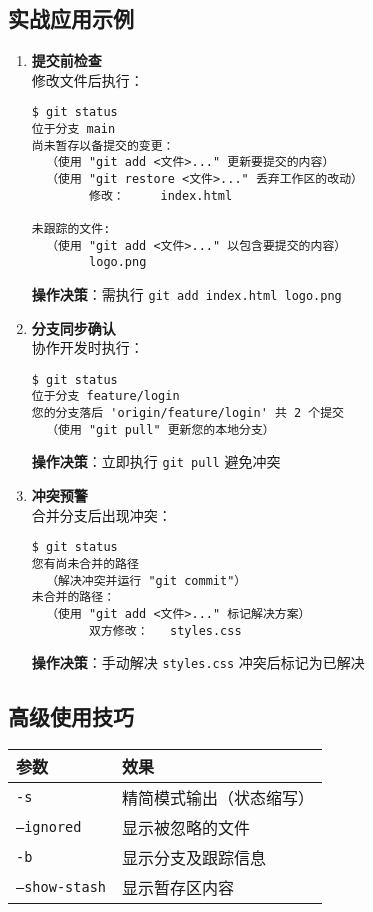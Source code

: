 \subsection{实战应用示例}
\begin{enumerate}[leftmargin=*, nosep]
    \item \textbf{提交前检查} \\
    修改文件后执行：
    \begin{verbatim}
$ git status
位于分支 main
尚未暂存以备提交的变更：
  （使用 "git add <文件>..." 更新要提交的内容）
  （使用 "git restore <文件>..." 丢弃工作区的改动）
        修改：     index.html

未跟踪的文件:
  （使用 "git add <文件>..." 以包含要提交的内容）
        logo.png
    \end{verbatim}
    \textbf{操作决策}：需执行 \texttt{git add index.html logo.png}
    
    \item \textbf{分支同步确认} \\
    协作开发时执行：
    
\begin{verbatim}
$ git status
位于分支 feature/login
您的分支落后 'origin/feature/login' 共 2 个提交
  （使用 "git pull" 更新您的本地分支）
    \end{verbatim}
    \textbf{操作决策}：立即执行 \texttt{git pull} 避免冲突
    
    \item \textbf{冲突预警} \\
    合并分支后出现冲突：
    
\begin{verbatim}
$ git status
您有尚未合并的路径
  （解决冲突并运行 "git commit"）
未合并的路径：
  （使用 "git add <文件>..." 标记解决方案）
        双方修改：   styles.css
    \end{verbatim}
    \textbf{操作决策}：手动解决 \texttt{styles.css} 冲突后标记为已解决
\end{enumerate}

\subsection{高级使用技巧}
\begin{center}
\begin{tabular}{ll}
    \toprule
    \textbf{参数} & \textbf{效果} \\
    \midrule
    \texttt{-s} & 精简模式输出（状态缩写） \\
    \texttt{--ignored} & 显示被忽略的文件 \\
    \texttt{-b} & 显示分支及跟踪信息 \\
    \texttt{--show-stash} & 显示暂存区内容 \\
    \bottomrule
\end{tabular}
\end{center}

